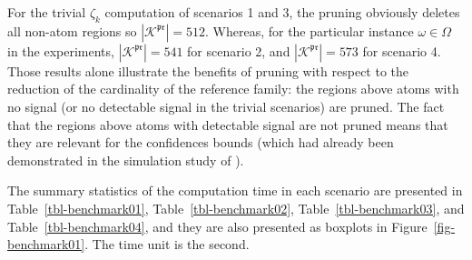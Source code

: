 \documentclass[
  11pt,
  a4paper,
]{article}
\theoremstyle{definition}
\theoremstyle{plain}
\theoremstyle{plain}
\theoremstyle{plain}
\theoremstyle{definition}
\theoremstyle{remark}
\begin{document}
For the trivial \(\zeta_k\) computation of scenarios 1 and 3, the
pruning obviously deletes all non-atom regions so
\(|\mathcal{K}^{\mathfrak{pr}}|=512\). Whereas, for the particular
instance \(\omega\in\Omega\) in the experiments,
\(|\mathcal{K}^{\mathfrak{pr}}|=541\) for scenario 2, and
\(|\mathcal{K}^{\mathfrak{pr}}|=573\) for scenario 4. Those results
alone illustrate the benefits of pruning with respect to the reduction
of the cardinality of the reference family: the regions above atoms with
no signal (or no detectable signal in the trivial scenarios) are pruned.
The fact that the regions above atoms with detectable signal are not
pruned means that they are relevant for the confidences bounds (which
had already been demonstrated in the simulation study of
\citet{MR4178188}).

The summary statistics of the computation time in each scenario are
presented in Table~\ref{tbl-benchmark01}, Table~\ref{tbl-benchmark02},
Table~\ref{tbl-benchmark03}, and Table~\ref{tbl-benchmark04}, and they
are also presented as boxplots in Figure~\ref{fig-benchmark01}. The time
unit is the second.
\end{document}
